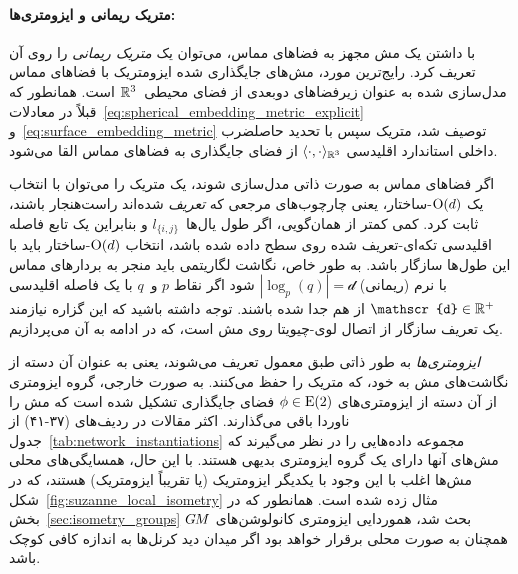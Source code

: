 \paragraph{متریک ریمانی و ایزومتری‌ها:}
با داشتن یک مش مجهز به فضاهای مماس، می‌توان یک \emph{متریک ریمانی} را روی آن تعریف کرد.
رایج‌ترین مورد، مش‌های جایگذاری شده ایزومتریک با فضاهای مماس مدل‌سازی شده به عنوان زیرفضاهای دوبعدی از فضای محیطی~$\mathbb{R}^3$ است.
همانطور که قبلاً در معادلات~\eqref{eq:spherical_embedding_metric_explicit} و~\eqref{eq:surface_embedding_metric} توصیف شد، متریک سپس با تحدید حاصلضرب داخلی استاندارد اقلیدسی $\langle\cdot,\cdot\rangle_{\mathbb{R}^3}$ از فضای جایگذاری به فضاهای مماس القا می‌شود.

اگر فضاهای مماس به صورت ذاتی مدل‌سازی شوند، یک متریک را می‌توان با انتخاب یک $\operatorname{O}(d)$-ساختار، یعنی چارچوب‌های مرجعی که \emph{تعریف} شده‌اند راست‌هنجار باشند، ثابت کرد.
کمی کمتر از همان‌گویی، اگر طول یال‌ها~$l_{\{i,j\}}$ و بنابراین یک تابع فاصله اقلیدسی تکه‌ای-تعریف شده روی سطح داده شده باشد، انتخاب $\operatorname{O}(d)$-ساختار باید با این طول‌ها سازگار باشد.
به طور خاص، نگاشت لگاریتمی باید منجر به بردارهای مماس با نرم (ریمانی) $|\log_p(q)| = \mathscr{d}$ شود اگر نقاط $p$ و~$q$ با یک فاصله اقلیدسی $\mathscr{d} \in \R^+$ از هم جدا شده باشند.
توجه داشته باشید که این گزاره نیازمند یک تعریف سازگار از اتصال لوی-چیویتا روی مش است، که در ادامه به آن می‌پردازیم.


\emph{ایزومتری‌ها} به طور ذاتی طبق معمول تعریف می‌شوند، یعنی به عنوان آن دسته از نگاشت‌های مش به خود، که متریک را حفظ می‌کنند.
به صورت خارجی، گروه ایزومتری از آن دسته از ایزومتری‌های $\phi \in \operatorname{E}(2)$ فضای جایگذاری تشکیل شده است که مش را ناوردا باقی می‌گذارند.
اکثر مقالات در
ردیف‌های (۳۷-۴۱)
از جدول~\ref{tab:network_instantiations}
مجموعه داده‌هایی را در نظر می‌گیرند که مش‌های آنها دارای یک گروه ایزومتری بدیهی هستند.
با این حال، همسایگی‌های محلی مش‌ها اغلب با این وجود با یکدیگر ایزومتریک (یا تقریباً ایزومتریک) هستند، که در شکل~\ref{fig:suzanne_local_isometry} مثال زده شده است.
همانطور که در بخش~\ref{sec:isometry_groups} بحث شد، هموردایی ایزومتری کانولوشن‌های $G\mkern-1.4muM$ همچنان به صورت محلی برقرار خواهد بود اگر میدان دید کرنل‌ها به اندازه کافی کوچک باشد.








